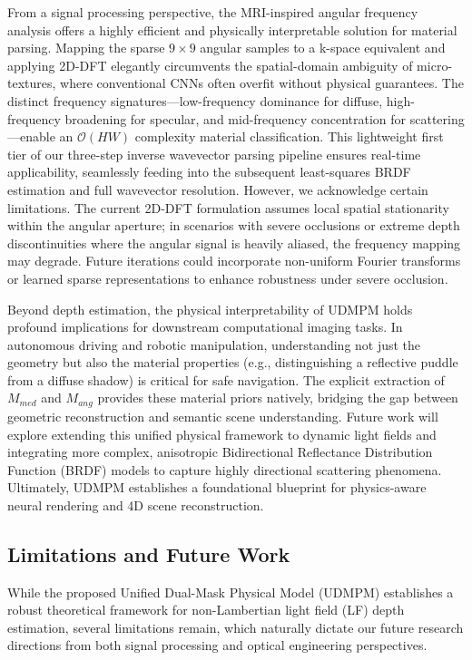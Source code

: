 \documentclass[journal]{IEEEtran}
\begin{document}
From a signal processing perspective, the MRI-inspired angular frequency analysis offers a highly efficient and physically interpretable solution for material parsing. Mapping the sparse $9 \times 9$ angular samples to a k-space equivalent and applying 2D-DFT elegantly circumvents the spatial-domain ambiguity of micro-textures, where conventional CNNs often overfit without physical guarantees. The distinct frequency signatures—low-frequency dominance for diffuse, high-frequency broadening for specular, and mid-frequency concentration for scattering—enable an $\mathcal{O}(HW)$ complexity material classification. This lightweight first tier of our three-step inverse wavevector parsing pipeline ensures real-time applicability, seamlessly feeding into the subsequent least-squares BRDF estimation and full wavevector resolution. However, we acknowledge certain limitations. The current 2D-DFT formulation assumes local spatial stationarity within the angular aperture; in scenarios with severe occlusions or extreme depth discontinuities where the angular signal is heavily aliased, the frequency mapping may degrade. Future iterations could incorporate non-uniform Fourier transforms or learned sparse representations to enhance robustness under severe occlusion.

Beyond depth estimation, the physical interpretability of UDMPM holds profound implications for downstream computational imaging tasks. In autonomous driving and robotic manipulation, understanding not just the geometry but also the material properties (e.g., distinguishing a reflective puddle from a diffuse shadow) is critical for safe navigation. The explicit extraction of $M_{med}$ and $M_{ang}$ provides these material priors natively, bridging the gap between geometric reconstruction and semantic scene understanding. Future work will explore extending this unified physical framework to dynamic light fields and integrating more complex, anisotropic Bidirectional Reflectance Distribution Function (BRDF) models to capture highly directional scattering phenomena. Ultimately, UDMPM establishes a foundational blueprint for physics-aware neural rendering and 4D scene reconstruction.

\subsection{Limitations and Future Work}

While the proposed Unified Dual-Mask Physical Model (UDMPM) establishes a robust theoretical framework for non-Lambertian light field (LF) depth estimation, several limitations remain, which naturally dictate our future research directions from both signal processing and optical engineering perspectives.
\end{document}
